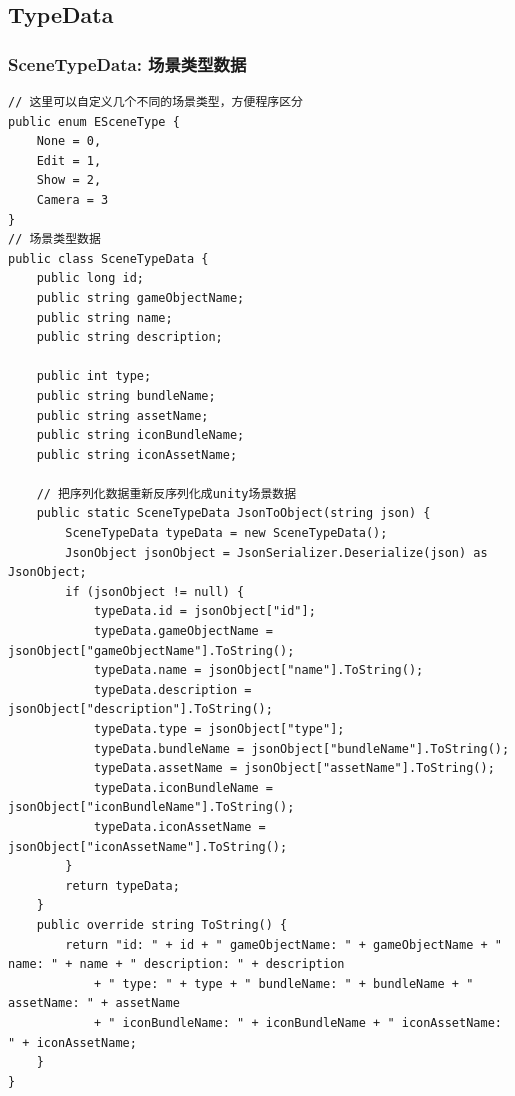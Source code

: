 \documentclass[9pt, b5paper]{article}
\begin{document}
\subsection{TypeData}
\label{sec-10-2}
\subsubsection{SceneTypeData: 场景类型数据}
\label{sec-10-2-1}
\begin{verbatim}
// 这里可以自定义几个不同的场景类型，方便程序区分
public enum ESceneType {
    None = 0,
    Edit = 1,
    Show = 2,
    Camera = 3
}
// 场景类型数据
public class SceneTypeData {
    public long id;
    public string gameObjectName;
    public string name;
    public string description;

    public int type;
    public string bundleName;
    public string assetName;
    public string iconBundleName;
    public string iconAssetName;

    // 把序列化数据重新反序列化成unity场景数据
    public static SceneTypeData JsonToObject(string json) {
        SceneTypeData typeData = new SceneTypeData();
        JsonObject jsonObject = JsonSerializer.Deserialize(json) as JsonObject;
        if (jsonObject != null) {
            typeData.id = jsonObject["id"];
            typeData.gameObjectName = jsonObject["gameObjectName"].ToString();
            typeData.name = jsonObject["name"].ToString();
            typeData.description = jsonObject["description"].ToString();
            typeData.type = jsonObject["type"];
            typeData.bundleName = jsonObject["bundleName"].ToString();
            typeData.assetName = jsonObject["assetName"].ToString();
            typeData.iconBundleName = jsonObject["iconBundleName"].ToString();
            typeData.iconAssetName = jsonObject["iconAssetName"].ToString();
        }
        return typeData;
    }
    public override string ToString() {
        return "id: " + id + " gameObjectName: " + gameObjectName + " name: " + name + " description: " + description
            + " type: " + type + " bundleName: " + bundleName + " assetName: " + assetName
            + " iconBundleName: " + iconBundleName + " iconAssetName: " + iconAssetName;
    }
}
\end{verbatim}
\end{document}
